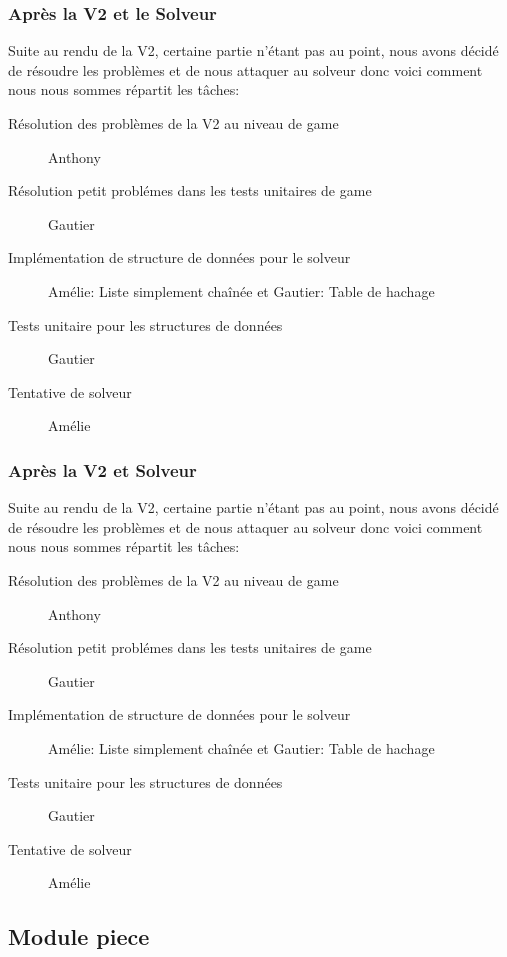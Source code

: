 \documentclass{report}
\begin{document}
\subsubsection*{Après la V2 et le Solveur}
Suite au rendu de la V2, certaine partie n'étant pas au point, nous avons décidé de résoudre les problèmes et de nous attaquer au solveur donc voici comment nous nous sommes répartit les tâches:
\begin{description}
\item [Résolution des problèmes de la V2 au niveau de game] Anthony
\item [Résolution petit problémes dans les tests unitaires de game] Gautier
\item [Implémentation de structure de données pour le solveur] Amélie: Liste simplement chaînée et Gautier: Table de hachage
\item [Tests unitaire pour les structures de données] Gautier
\item[Tentative de solveur]Amélie
\end{description}

\subsubsection*{Après la V2 et Solveur}
Suite au rendu de la V2, certaine partie n'étant pas au point, nous avons décidé de résoudre les problèmes et de nous attaquer au solveur donc voici comment nous nous sommes répartit les tâches:

\begin{description}
\item [Résolution des problèmes de la V2 au niveau de game] Anthony
\item [Résolution petit problémes dans les tests unitaires de game] Gautier
\item [Implémentation de structure de données pour le solveur] Amélie: Liste simplement chaînée et Gautier: Table de hachage
\item [Tests unitaire pour les structures de données] Gautier
\item[Tentative de solveur]Amélie
\end{description}

\subsection{Module piece}
\end{document}
